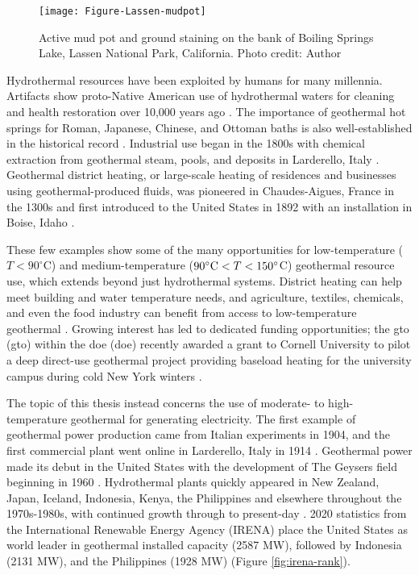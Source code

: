 \begin{figure}
\centering
\texttt{[image: Figure-Lassen-mudpot]}
\caption[Mud pot, Lassen National Park]{Active mud pot and ground staining on the bank of Boiling Springs Lake, Lassen National Park, California. Photo credit: Author}
\label{fig:lassen-mudpot}
\end{figure}

Hydrothermal resources have been exploited by humans for many millennia. Artifacts show proto-Native American use of hydrothermal waters for cleaning and health restoration over 10,000 years ago \citep{doe_history_2021}. The importance of geothermal hot springs for Roman, Japanese, Chinese, and Ottoman baths is also well-established in the historical record \citep{lund_characteristics_2007}. Industrial use began in the 1800s with chemical extraction from geothermal steam, pools, and deposits in Larderello, Italy \citep[p.\ 251]{dipippo_geothermal_2012}. Geothermal district heating, or large-scale heating of residences and businesses using geothermal-produced fluids, was pioneered in Chaudes-Aigues, France in the 1300s and first introduced to the United States in 1892 with an installation in Boise, Idaho \citep{lund_characteristics_2007}.

These few examples show some of the many opportunities for low-temperature ($T<90^\circ$C) and medium-temperature ($90^\circ{\rm C}<T<150^\circ$C) geothermal resource use, which extends beyond just hydrothermal systems. District heating can help meet building and water temperature needs, and agriculture, textiles, chemicals, and even the food industry can benefit from access to low-temperature geothermal \citep{doe_low_2021, liu_overview_2015}. Growing interest has led to dedicated funding opportunities; the \acrlong{gto} (\acrshort{gto}) within the \acrlong{doe} (\acrshort{doe}) recently awarded a grant to Cornell University to pilot a deep direct-use geothermal project providing baseload heating for the university campus during cold New York winters \citep{hamm_geothermal_2021,tester_integrating_2015}.

The topic of this thesis instead concerns the use of moderate- to high-temperature geothermal for generating electricity. The first example of geothermal power production came from Italian experiments in 1904, and the first commercial plant went online in Larderello, Italy in 1914 \citep[p.\ 251]{dipippo_geothermal_2012}. Geothermal power made its debut in the United States with the development of The Geysers field beginning in 1960 \citep{tester_future_2006}. Hydrothermal plants quickly appeared in New Zealand, Japan, Iceland, Indonesia, Kenya, the Philippines and elsewhere throughout the 1970s-1980s, with continued growth through to present-day \citep{lund_characteristics_2007}. 2020 statistics from the International Renewable Energy Agency (IRENA) place the United States as world leader in geothermal installed capacity (2587 MW), followed by Indonesia (2131 MW), and the Philippines (1928 MW) \citep{irena_country_2021} (Figure \ref{fig:irena-rank}). 

